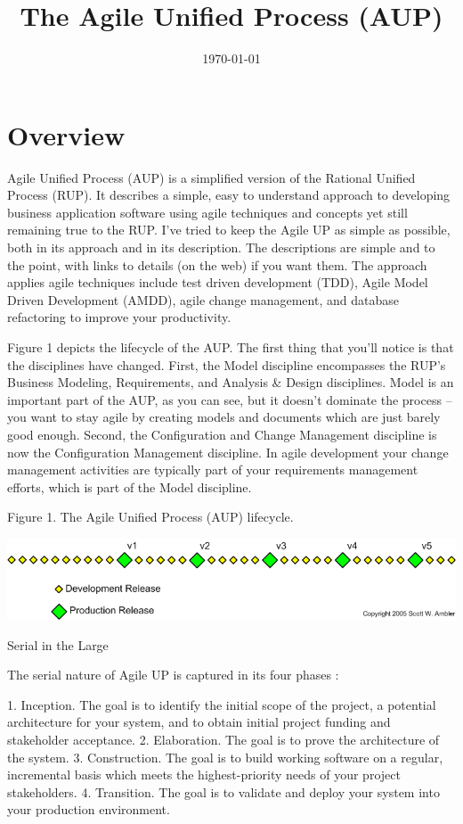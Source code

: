 \documentclass[spanish]{article}
\title{The Agile Unified Process (AUP)}
\date{\today}
\begin{document}
\maketitle\thispagestyle{empty}

\section{Overview}

Agile Unified Process (AUP) is a simplified version of the Rational Unified Process (RUP).
It describes a simple, easy to understand approach to developing business application software using agile techniques and concepts yet still remaining true to the RUP.
I've tried to keep the Agile UP as simple as possible, both in its approach and in its description.
The descriptions are simple and to the point, with links to details (on the web) if you want them.
The approach applies agile techniques include test driven development (TDD), Agile Model Driven Development (AMDD), agile change management, and database refactoring to improve your productivity.

Figure 1 depicts the lifecycle of the AUP.
The first thing that you'll notice is that the disciplines have changed.
First, the Model discipline encompasses the RUP's Business Modeling, Requirements, and Analysis \& Design disciplines.
Model is an important part of the AUP, as you can see, but it doesn't dominate the process -- you want to stay agile by creating models and documents which are just barely good enough.
Second, the Configuration and Change Management discipline is now the Configuration Management discipline.
In agile development your change management activities are typically part of your requirements management efforts, which is part of the Model discipline.

Figure 1. The Agile Unified Process (AUP) lifecycle.

\includegraphics[scale=0.5]{incrementalReleases}


Serial in the Large

The serial nature of Agile UP is captured in its four phases :

   1. Inception. The goal is to identify the initial scope of the project, a potential architecture for your system, and to obtain initial project funding and stakeholder acceptance.
   2. Elaboration.  The goal is to prove the architecture of the system.
   3. Construction.  The goal is to build working software on a regular, incremental basis which meets the highest-priority needs of your project stakeholders.
   4. Transition.  The goal is to validate and deploy your system into your production environment.
\end{document}
